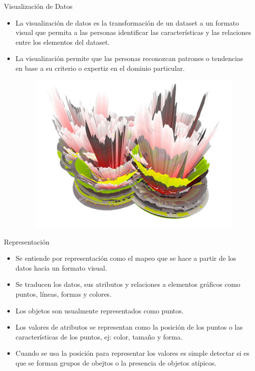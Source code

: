 \documentclass[handout]{beamer}
\begin{document}
\begin{frame}[fragile]{Visualización de Datos}
\scriptsize{
\begin{itemize}
 \item La visualización de datos es la transformación de un dataset a un formato visual que permita a las personas identificar las características y las relaciones entre los elementos del dataset.
 
 \item La visualización permite que las personas reconozcan patrones o tendencias en base a su criterio o expertiz en el dominio particular.
 
   \begin{figure}[h!]
	\centering
	\includegraphics[scale=0.38]{pics/visua.jpg}
	
	
\end{figure} 
 
\end{itemize}

}
 
\end{frame}

\begin{frame}{Representación}
\scriptsize{
\begin{itemize}
 \item Se entiende por representación como el mapeo que se hace a partir de los datos hacia un formato visual.
 \item Se traducen los datos, sus atributos y relaciones a elementos gráficos como puntos, líneas, formas y colores. 
  \item Los objetos son usualmente representados como puntos.
  \item Los valores de atributos se representan como la posición de los puntos o las características de los puntos, ej: color, tamaño y forma.
  \item Cuando se usa la posición para representar los valores es simple detectar si es que se forman grupos de obejtos o la presencia de objetos atípicos. 
  
 
 
\end{itemize}
 
 

 
}
\end{frame}
\end{document}
